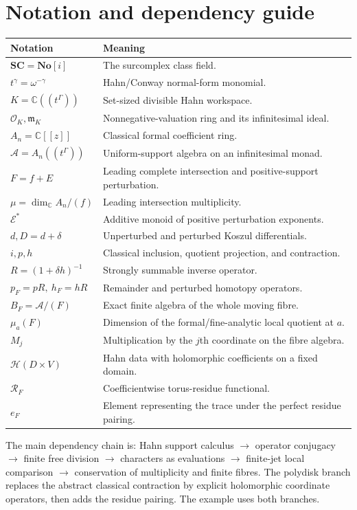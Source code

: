 \documentclass[11pt,letterpaper]{article}
\theoremstyle{definition}
\theoremstyle{remark}
\newcommand{\No}{\mathbf{No}}
\newcommand{\SC}{\mathbf{SC}}
\newcommand{\C}{\mathbb C}
\newcommand{\A}{\mathscr A}
\newcommand{\HH}{\mathscr H}
\newcommand{\OO}{\mathcal O}
\newcommand{\mm}{\mathfrak m}
\newcommand{\EE}{\mathcal E}
\numberwithin{equation}{section}
\begin{document}
\section{Notation and dependency guide}
\begin{center}\small
\begin{longtable}{@{}L{0.24\textwidth}L{0.67\textwidth}@{}}
\toprule
Notation & Meaning\\
\midrule
\endhead
$\SC=\No[i]$ & The surcomplex class field.\\[0.3em]
$t^\gamma=\omega^{-\gamma}$ & Hahn/Conway normal-form monomial.\\[0.3em]
$K=\C((t^\Gamma))$ & Set-sized divisible Hahn workspace.\\[0.3em]
$\OO_K,\mm_K$ & Nonnegative-valuation ring and its infinitesimal ideal.\\[0.3em]
$A_n=\C[[z]]$ & Classical formal coefficient ring.\\[0.3em]
$\A=A_n((t^\Gamma))$ & Uniform-support algebra on an infinitesimal monad.\\[0.3em]
$F=f+E$ & Leading complete intersection and positive-support perturbation.\\[0.3em]
$\mu=\dim_\C A_n/(f)$ & Leading intersection multiplicity.\\[0.3em]
$\EE^*$ & Additive monoid of positive perturbation exponents.\\[0.3em]
$d,D=d+\delta$ & Unperturbed and perturbed Koszul differentials.\\[0.3em]
$i,p,h$ & Classical inclusion, quotient projection, and contraction.\\[0.3em]
$R=(1+\delta h)^{-1}$ & Strongly summable inverse operator.\\[0.3em]
$p_F=pR,\ h_F=hR$ & Remainder and perturbed homotopy operators.\\[0.3em]
$B_F=\A/(F)$ & Exact finite algebra of the whole moving fibre.\\[0.3em]
$\mu_a(F)$ & Dimension of the formal/fine-analytic local quotient at $a$.\\[0.3em]
$M_j$ & Multiplication by the $j$th coordinate on the fibre algebra.\\[0.3em]
$\HH(D\times V)$ & Hahn data with holomorphic coefficients on a fixed domain.\\[0.3em]
$\mathcal R_F$ & Coefficientwise torus-residue functional.\\[0.3em]
$e_F$ & Element representing the trace under the perfect residue pairing.\\
\bottomrule
\end{longtable}
\end{center}
\begin{samepage}
The main dependency chain is: Hahn support calculus $\to$ operator conjugacy $\to$ finite free division $\to$ characters as evaluations $\to$ finite-jet local comparison $\to$ conservation of multiplicity and finite fibres. The polydisk branch replaces the abstract classical contraction by explicit holomorphic coordinate operators, then adds the residue pairing. The example uses both branches.\par
\end{samepage}
\end{document}
